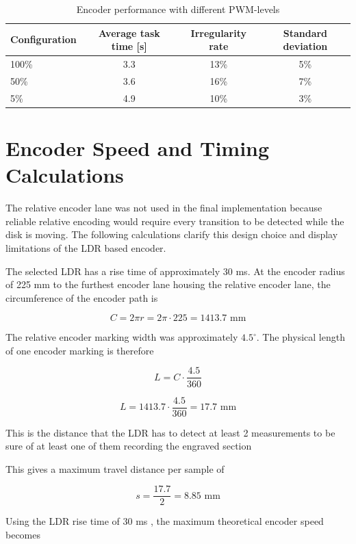 \begin{table}[H]
\centering
\begin{tabular}{|l|c|c|c|}
\hline
Configuration & Average task time [s] & Irregularity rate & Standard deviation \\
\hline
100\% & 3.3 & 13\%& 5\% \\
50\% & 3.6 & 16\% & 7\% \\
5\% & 4.9 & 10\%& 3\% \\

\hline
\end{tabular}
\caption{Encoder performance with different PWM-levels}
\label{tab:encoder-performance-pwm}
\end{table}




\clearpage
\section{Encoder Speed and Timing Calculations}
\label{app:encoder-speed-calculations}

The relative encoder lane was not used in the final implementation because reliable relative encoding would require every transition to be detected while the disk is moving. The following calculations clarify this design choice and display limitations of the LDR based encoder.

The selected LDR has a rise time of approximately 30 ms\cite{gl5528_datasheet}. At the encoder radius of 225 mm to the furthest encoder lane housing the relative encoder lane, the circumference of the encoder path is

\[
C = 2 \pi r = 2 \pi \cdot 225 = 1413.7 \text{ mm}
\]


The relative encoder marking width was approximately \(4.5^\circ\). The physical length of one encoder marking is therefore

\[
L = C \cdot \frac{4.5}{360}
\]

\[
L = 1413.7 \cdot \frac{4.5}{360} = 17.7 \text{ mm}
\]

This is the distance that the LDR has to detect at least 2 measurements to be sure of at least one of them recording the engraved section

This gives a maximum travel distance per sample of

\[
s = \frac{17.7}{2} = 8.85 \text{ mm}
\]

Using the LDR rise time of 30 ms \cite{gl5528_datasheet}, the maximum theoretical encoder speed becomes

